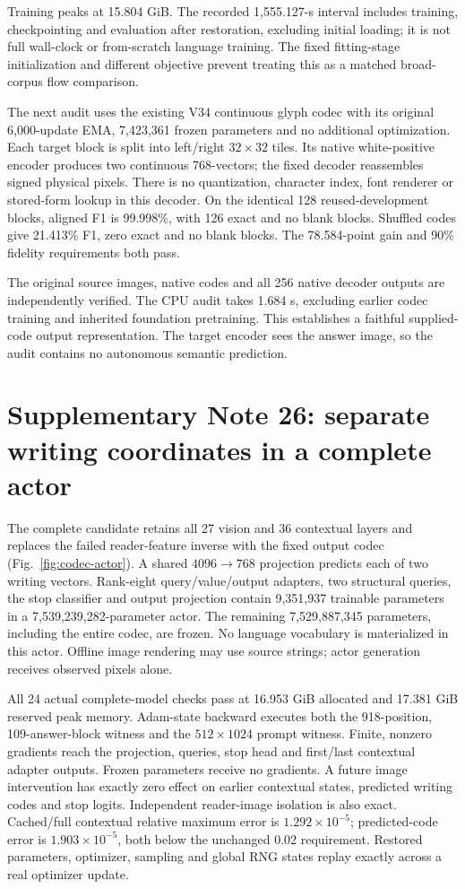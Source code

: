 \documentclass[10pt,a4paper]{article}
\begin{document}
Training peaks at 15.804 GiB. The recorded 1,555.127-s interval includes
training, checkpointing and evaluation after restoration, excluding initial
loading; it is not full wall-clock or from-scratch language training. The
fixed fitting-stage initialization and different objective prevent treating
this as a matched broad-corpus flow comparison.

The next audit uses the existing V34 continuous glyph codec with its original
6,000-update EMA, 7,423,361 frozen parameters and no additional optimization.
Each target block is split into left/right $32\times32$ tiles. Its native
white-positive encoder produces two continuous 768-vectors; the fixed decoder
reassembles signed physical pixels. There is no quantization, character index,
font renderer or stored-form lookup in this decoder. On the identical 128
reused-development blocks, aligned F1 is 99.998\%, with 126 exact and no blank
blocks. Shuffled codes give 21.413\% F1, zero exact and no blank blocks.
The 78.584-point gain and 90\% fidelity requirements both pass.

The original source images, native codes and all 256 native decoder outputs
are independently verified. The CPU audit takes 1.684 s, excluding earlier
codec training and inherited foundation pretraining. This establishes a
faithful supplied-code output representation. The target encoder sees the
answer image, so the audit contains no autonomous semantic prediction.

\section*{Supplementary Note 26: separate writing coordinates in a complete actor}
The complete candidate retains all 27 vision and 36 contextual layers and
replaces the failed reader-feature inverse with the fixed output codec
(Fig.~\ref{fig:codec-actor}). A shared $4096\to768$ projection predicts each
of two writing vectors. Rank-eight query/value/output adapters, two structural
queries, the stop classifier and output projection contain 9,351,937 trainable
parameters in a 7,539,239,282-parameter actor. The remaining 7,529,887,345
parameters, including the entire codec, are frozen. No language vocabulary is
materialized in this actor. Offline image rendering may use source strings;
actor generation receives observed pixels alone.

All 24 actual complete-model checks pass at 16.953 GiB allocated and 17.381 GiB
reserved peak memory. Adam-state backward executes both the 918-position,
109-answer-block witness and the $512\times1024$ prompt witness. Finite,
nonzero gradients reach the projection, queries, stop head and first/last
contextual adapter outputs. Frozen parameters receive no gradients. A future
image intervention has exactly zero effect on earlier contextual states,
predicted writing codes and stop logits. Independent reader-image isolation
is also exact. Cached/full contextual relative maximum error is
$1.292\times10^{-5}$; predicted-code error is $1.903\times10^{-5}$, both below
the unchanged 0.02 requirement. Restored parameters, optimizer, sampling and
global RNG states replay exactly across a real optimizer update.
\end{document}
